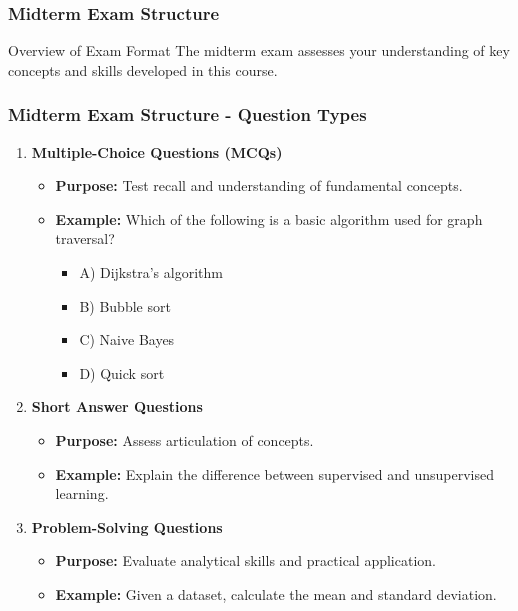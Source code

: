 \documentclass[aspectratio=169]{beamer}
\begin{document}
\begin{frame}[fragile]
    \frametitle{Midterm Exam Structure}
    \begin{block}{Overview of Exam Format}
        The midterm exam assesses your understanding of key concepts and skills developed in this course.
    \end{block}
\end{frame}

\begin{frame}[fragile]
    \frametitle{Midterm Exam Structure - Question Types}
    \begin{enumerate}
        \item \textbf{Multiple-Choice Questions (MCQs)}
            \begin{itemize}
                \item \textbf{Purpose:} Test recall and understanding of fundamental concepts.
                \item \textbf{Example:} Which of the following is a basic algorithm used for graph traversal?
                \begin{itemize}
                    \item A) Dijkstra's algorithm
                    \item B) Bubble sort
                    \item C) Naive Bayes
                    \item D) Quick sort
                \end{itemize}
            \end{itemize}
            
        \item \textbf{Short Answer Questions}
            \begin{itemize}
                \item \textbf{Purpose:} Assess articulation of concepts.
                \item \textbf{Example:} Explain the difference between supervised and unsupervised learning.
            \end{itemize}
        
        \item \textbf{Problem-Solving Questions}
            \begin{itemize}
                \item \textbf{Purpose:} Evaluate analytical skills and practical application.
                \item \textbf{Example:} Given a dataset, calculate the mean and standard deviation.
            \end{itemize}
    \end{enumerate}
\end{frame}
\end{document}
